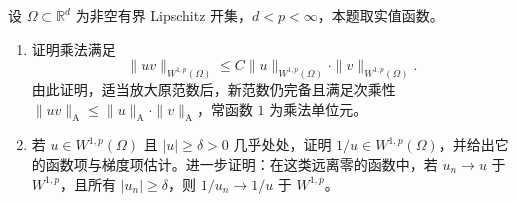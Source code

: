 \begin{exercise}\label{b1:ex:24-supercritical-algebra}
设 \(\Omega\subset\mathbb R^d\) 为非空有界 Lipschitz 开集，\(d<p<\infty\)，本题取实值函数。
\begin{enumerate}
 \item\label{b1:item:24-sobolev-algebra}
 证明乘法满足
 \[
  \|uv\|_{W^{1,p}(\Omega)}
       \le C\|u\|_{W^{1,p}(\Omega)}
                 \cdot\|v\|_{W^{1,p}(\Omega)}.
 \]
 由此证明，适当放大原范数后，新范数仍完备且满足次乘性
 \(\|uv\|_{\mathrm A}\le\|u\|_{\mathrm A}\cdot\|v\|_{\mathrm A}\)，常函数 \(1\) 为乘法单位元。
 \item\label{b1:item:24-sobolev-inversion}
 若 \(u\in W^{1,p}(\Omega)\) 且 \(|u|\ge\delta>0\) 几乎处处，证明
 \(1/u\in W^{1,p}(\Omega)\)，并给出它的函数项与梯度项估计。进一步证明：在这类远离零的函数中，若 \(u_n\to u\) 于 \(W^{1,p}\)，且所有 \(|u_n|\ge\delta\)，则
 \(1/u_n\to1/u\) 于 \(W^{1,p}\)。
\end{enumerate}
\end{exercise}
